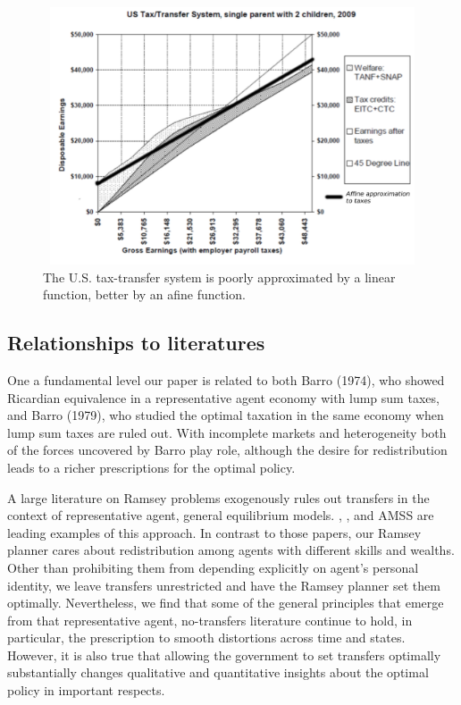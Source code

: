 \documentclass[thmsb,11pt]{article}
\begin{document}
  \begin{figure}[htp]
 \centering
 \includegraphics[width=5in,height=3in]{Draft25Graphs/affine_taxes.pdf}
 \caption{ The U.S. tax-transfer system is poorly approximated by a linear function, better by an afine
function.}
 \label{fig:affine_taxes}
 \end{figure}


\subsection{Relationships to literatures}

One a fundamental level our paper is related to both Barro (1974), who showed Ricardian equivalence in a representative agent economy with lump sum taxes, and Barro (1979), who studied the optimal taxation in the same economy when lump sum taxes are ruled out. With incomplete markets and heterogeneity both of the forces uncovered by Barro play role, although the desire for redistribution leads to a richer prescriptions for the optimal policy. 

 A large  literature on Ramsey problems  exogenously rules out transfers in the context of representative agent, general equilibrium models.
  \citet{LucasJr.1983}, \citet{Chari1994},  and AMSS are leading  examples of this approach.
In contrast to those papers, our Ramsey planner cares about redistribution among
agents with different skills and wealths. Other than prohibiting them from depending explicitly
on agent's personal identity, we leave   transfers unrestricted and have the Ramsey planner set
them optimally. Nevertheless, we find that  some of the general principles that emerge from that
representative agent, no-transfers literature continue to hold, in particular, the prescription to
smooth distortions across time and states.  However, it is also true that
allowing the government to set transfers optimally substantially changes
qualitative and quantitative insights about the optimal policy in important respects. 
\end{document}
